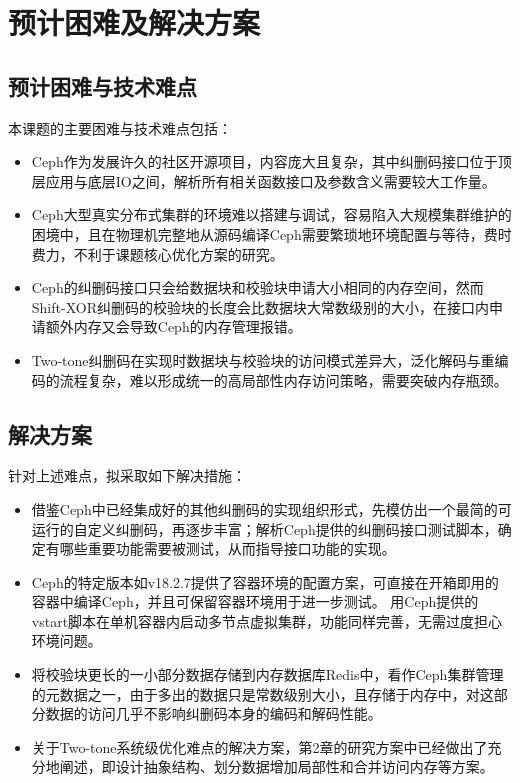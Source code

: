 \chapter{预计困难及解决方案}

\section{预计困难与技术难点}

本课题的主要困难与技术难点包括：

\begin{itemize}
    \item Ceph作为发展许久的社区开源项目，内容庞大且复杂，其中纠删码接口位于顶层应用与底层IO之间，解析所有相关函数接口及参数含义需要较大工作量。
    \item Ceph大型真实分布式集群的环境难以搭建与调试，容易陷入大规模集群维护的困境中，且在物理机完整地从源码编译Ceph需要繁琐地环境配置与等待，费时费力，不利于课题核心优化方案的研究。
    \item Ceph的纠删码接口只会给数据块和校验块申请大小相同的内存空间，然而Shift-XOR纠删码的校验块的长度会比数据块大常数级别的大小，在接口内申请额外内存又会导致Ceph的内存管理报错。
    \item Two-tone纠删码在实现时数据块与校验块的访问模式差异大，泛化解码与重编码的流程复杂，难以形成统一的高局部性内存访问策略，需要突破内存瓶颈。
\end{itemize}

\section{解决方案}

针对上述难点，拟采取如下解决措施：

\begin{itemize}
    \item 借鉴Ceph中已经集成好的其他纠删码的实现组织形式，先模仿出一个最简的可运行的自定义纠删码，再逐步丰富；解析Ceph提供的纠删码接口测试脚本，确定有哪些重要功能需要被测试，从而指导接口功能的实现。
    \item Ceph的特定版本如v18.2.7提供了容器环境的配置方案，可直接在开箱即用的容器中编译Ceph，并且可保留容器环境用于进一步测试。
    用Ceph提供的vstart脚本在单机容器内启动多节点虚拟集群，功能同样完善，无需过度担心环境问题。
    \item 将校验块更长的一小部分数据存储到内存数据库Redis中，看作Ceph集群管理的元数据之一，由于多出的数据只是常数级别大小，且存储于内存中，对这部分数据的访问几乎不影响纠删码本身的编码和解码性能。
    \item 关于Two-tone系统级优化难点的解决方案，第2章的研究方案中已经做出了充分地阐述，即设计抽象结构、划分数据增加局部性和合并访问内存等方案。
\end{itemize}
